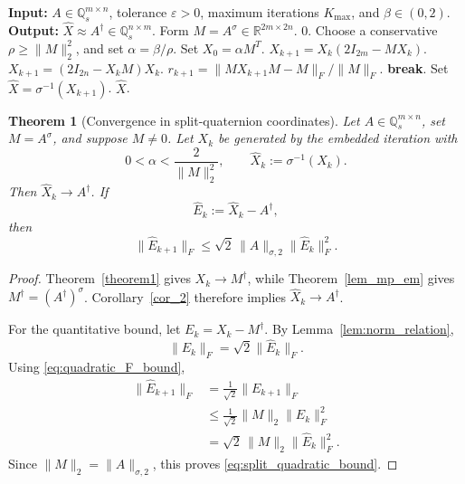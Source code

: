 \documentclass[12pt,a4paper]{article}
\theoremstyle{plain}
\newtheorem{theorem}{Theorem}[section]
\theoremstyle{definition}
\theoremstyle{remark}
\begin{document}
\begin{algorithm}[H]
\caption{Embedded Newton--Schulz method for a split-quaternion Moore--Penrose inverse.}
\label{alg:newton_split}
\begin{algorithmic}[1]
\STATE \textbf{Input:} \(A\in\mathbb{Q}_s^{m\times n}\), tolerance \(\varepsilon>0\), maximum iterations \(K_{\max}\), and \(\beta\in(0,2)\).
\STATE \textbf{Output:} \(\widehat X\approx A^\dagger\in\mathbb{Q}_s^{n\times m}\).
\STATE Form \(M=A^\sigma\in\mathbb{R}^{2m\times2n}\).
    \RETURN \(0\).
\ENDIF
\STATE Choose a conservative \(\rho\geq\|M\|_2^2\), and set \(\alpha=\beta/\rho\).
\STATE Set \(X_0=\alpha M^T\).
        \STATE \(X_{k+1}=X_k(2I_{2m}-MX_k)\).
    \ELSE
        \STATE \(X_{k+1}=(2I_{2n}-X_kM)X_k\).
    \ENDIF
    \STATE \(r_{k+1}=\|MX_{k+1}M-M\|_F/\|M\|_F\).
        \STATE \textbf{break}.
    \ENDIF
\ENDFOR
\STATE Set \(\widehat X=\sigma^{-1}(X_{k+1})\).
\RETURN \(\widehat X\).
\end{algorithmic}
\end{algorithm}

\begin{theorem}[Convergence in split-quaternion coordinates]
\label{thm:embedded_split_convergence}
Let \(A\in\mathbb{Q}_s^{m\times n}\), set \(M=A^\sigma\), and suppose \(M\neq0\). Let \(X_k\) be generated by the embedded iteration with
\[
    0<\alpha<\frac{2}{\|M\|_2^2}, \qquad \widehat X_k:=\sigma^{-1}(X_k).
\]
Then \(\widehat X_k\to A^\dagger\). If
\[
    \widehat E_k:=\widehat X_k-A^\dagger,
\]
then
\begin{equation} \label{eq:split_quadratic_bound}
    \|\widehat E_{k+1}\|_F \leq\sqrt2\,\|A\|_{\sigma,2}\|\widehat E_k\|_F^2.
\end{equation}
\end{theorem}

\begin{proof}
Theorem~\ref{theorem1} gives \(X_k\to M^\dagger\), while Theorem~\ref{lem_mp_em} gives \(M^\dagger=(A^\dagger)^\sigma\). Corollary~\ref{cor_2} therefore implies \(\widehat X_k\to A^\dagger\).

For the quantitative bound, let \(E_k=X_k-M^\dagger\). By Lemma~\ref{lem:norm_relation},
\[
    \|E_k\|_F=\sqrt2\|\widehat E_k\|_F.
\]
Using \eqref{eq:quadratic_F_bound},
\begin{align*}
    \|\widehat E_{k+1}\|_F
    &=\frac1{\sqrt2}\|E_{k+1}\|_F\\
    &\leq\frac1{\sqrt2}\|M\|_2\|E_k\|_F^2\\
    &=\sqrt2\,\|M\|_2\|\widehat E_k\|_F^2.
\end{align*}
Since \(\|M\|_2=\|A\|_{\sigma,2}\), this proves \eqref{eq:split_quadratic_bound}.
\end{proof}
\end{document}

